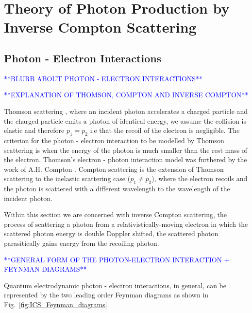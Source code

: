 \documentclass[../main.tex]{subfiles}
\begin{document}
\chapter{Theory of Photon Production by Inverse Compton Scattering}
\label{Theory_of_Photon_Production_by_Inverse_Compton_Scattering} %

\section{Photon - Electron Interactions}

\textcolor{blue}{**BLURB ABOUT PHOTON - ELECTRON INTERACTIONS**}

\textcolor{blue}{**EXPLANATION OF THOMSON, COMPTON AND INVERSE COMPTON**}

Thomson scattering \cite{thomson1904xxxiv}, where an incident photon accelerates a charged particle and the charged particle emits a photon of identical energy, we assume the collision is elastic and therefore $p_{1} = p_{2}$ i.e that the recoil of the electron is negligible. The criterion for the photon - electron interaction to be modelled by Thomson scattering is when the energy of the photon is much smaller than the rest mass of the electron. Thomson's electron - photon interaction model was furthered by the work of A.H. Compton \cite{compton1923quantum}. Compton scattering is the extension of Thomson scattering to the inelastic scattering case ($p_{1} \neq p_{2}$), where the electron recoils and the photon is scattered with a different wavelength to the wavelength of the incident photon.

Within this section we are concerned with inverse Compton scattering, the process of scattering a photon from a relativistically-moving  electron in which the scattered photon energy is double Doppler shifted, the scattered photon parasitically gains energy from the recoiling photon.  

\textcolor{blue}{**GENERAL FORM OF THE PHOTON-ELECTRON INTERACTION + FEYNMAN DIAGRAMS**}

Quantum electrodynamic photon - electron interactions, in general, can be represented by the two leading order Feynman diagrams as shown in Fig.~\ref{fig:ICS_Feynman_diagrams}. 
\end{document}
